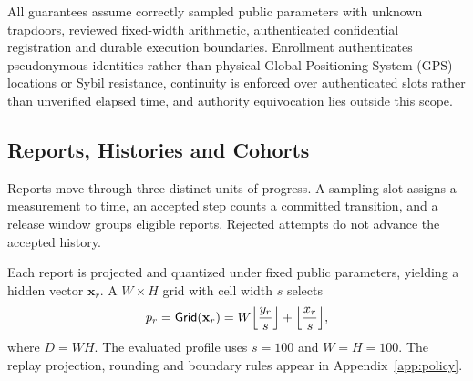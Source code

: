 \documentclass[conference,compsoc]{IEEEtran}
\theoremstyle{definition}
\numberwithin{equation}{section}
\numberwithin{table}{section}
\numberwithin{figure}{section}
\theoremstyle{plain}
\begin{document}
All guarantees assume correctly sampled public parameters with unknown trapdoors, reviewed fixed-width
arithmetic, authenticated confidential registration and durable execution boundaries.
Enrollment authenticates pseudonymous identities rather than physical Global Positioning System (GPS) locations or Sybil
resistance, continuity is enforced over authenticated slots rather than unverified elapsed time, and
authority equivocation lies outside this scope.

\subsection{Reports, Histories and Cohorts}
\label{sec:prelim-model}

Reports move through three distinct units of progress. A sampling slot assigns
a measurement to time, an accepted step counts a committed transition, and a
release window groups eligible reports. Rejected attempts do not advance the
accepted history.

Each report is projected and quantized under fixed public parameters, yielding
a hidden vector \(\mathbf{x}_r\). A \(W\times H\) grid with cell width \(s\)
selects
\begin{equation}
  p_r=\mathsf{Grid}(\mathbf{x}_r)
  =W\Bigl\lfloor\frac{y_r}{s}\Bigr\rfloor+\Bigl\lfloor\frac{x_r}{s}\Bigr\rfloor,
  \label{eq:canonical-grid}
\end{equation}
where \(D=WH\). The evaluated profile uses \(s=100\) and \(W=H=100\).
The replay projection, rounding and boundary rules appear in
Appendix~\ref{app:policy}.
\end{document}
